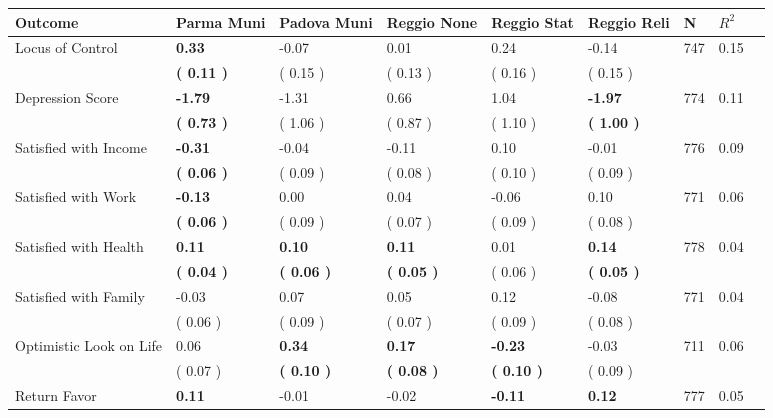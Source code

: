\begin{tabular}{L{6.2cm} C{1.8cm} C{1.8cm} C{1.8cm} C{1.8cm} C{1.8cm} C{1.8cm} C{0.3cm} C{0.3cm}}
\toprule
 \textbf{Outcome} & \textbf{Parma Muni} & \textbf{Padova Muni} & \textbf{Reggio None} & \textbf{Reggio Stat} & \textbf{Reggio Reli} & \textbf{N} & \textbf{$ R^2$} \\
\midrule
Locus of Control & \textbf{     0.33} &     -0.07 &      0.01 &      0.24 &     -0.14  & 747 &       0.15 \\ 
 & \textbf{(     0.11 )} & (     0.15 ) & (     0.13 ) & (     0.16 ) & (     0.15 )  & \\
Depression Score & \textbf{    -1.79} &     -1.31 &      0.66 &      1.04 & \textbf{    -1.97}  & 774 &       0.11 \\ 
 & \textbf{(     0.73 )} & (     1.06 ) & (     0.87 ) & (     1.10 ) & \textbf{(     1.00 )}  & \\
Satisfied with Income & \textbf{    -0.31} &     -0.04 &     -0.11 &      0.10 &     -0.01  & 776 &       0.09 \\ 
 & \textbf{(     0.06 )} & (     0.09 ) & (     0.08 ) & (     0.10 ) & (     0.09 )  & \\
Satisfied with Work & \textbf{    -0.13} &      0.00 &      0.04 &     -0.06 &      0.10  & 771 &       0.06 \\ 
 & \textbf{(     0.06 )} & (     0.09 ) & (     0.07 ) & (     0.09 ) & (     0.08 )  & \\
Satisfied with Health & \textbf{     0.11} & \textbf{     0.10} & \textbf{     0.11} &      0.01 & \textbf{     0.14}  & 778 &       0.04 \\ 
 & \textbf{(     0.04 )} & \textbf{(     0.06 )} & \textbf{(     0.05 )} & (     0.06 ) & \textbf{(     0.05 )}  & \\
Satisfied with Family &     -0.03 &      0.07 &      0.05 &      0.12 &     -0.08  & 771 &       0.04 \\ 
 & (     0.06 ) & (     0.09 ) & (     0.07 ) & (     0.09 ) & (     0.08 )  & \\
Optimistic Look on Life &      0.06 & \textbf{     0.34} & \textbf{     0.17} & \textbf{    -0.23} &     -0.03  & 711 &       0.06 \\ 
 & (     0.07 ) & \textbf{(     0.10 )} & \textbf{(     0.08 )} & \textbf{(     0.10 )} & (     0.09 )  & \\
Return Favor & \textbf{     0.11} &     -0.01 &     -0.02 & \textbf{    -0.11} & \textbf{     0.12}  & 777 &       0.05 \\ 

\end{tabular}
